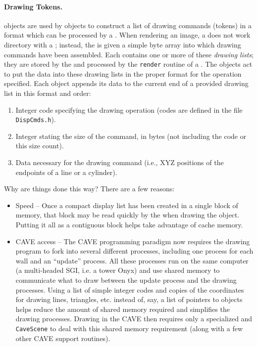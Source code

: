\paragraph{Drawing Tokens.}
 objects are used by  objects to construct a list of drawing commands (tokens) in a format which can be processed by a .  When rendering an image, a  does not work directory with a ; instead, the  is given a simple byte array into which drawing commands have been assembled.  Each  contains one or more of these {\em drawing lists}; they are stored by the  and processed by the {\tt render} routine of a .  The  objects act to put the data into these drawing lists in the proper format for the operation specified.  Each  object appends its data to the current end of a provided drawing list in this format and order:
\begin{enumerate}
  \item Integer code specifying the drawing operation (codes are defined in the file {\tt DispCmds.h}).
  \item Integer stating the size of the command, in bytes (not including the code or this size count).
  \item Data necessary for the drawing command (i.e., XYZ positions of the endpoints of a line or a cylinder).
\end{enumerate}
Why are things done this way?  There are a few reasons:
\begin{itemize}
  \item Speed -- Once a compact display list has been created in a single block of memory, that block may be read quickly by the  when drawing the object.  Putting it all as a contiguous block helps take advantage of cache memory.
  \item CAVE access -- The CAVE programming paradigm now requires the drawing program to fork into several different processes, including one process for each wall and an ``update'' process.  All these processes run on the same computer (a multi-headed SGI, i.e. a tower Onyx) and use shared memory to communicate what to draw between the update process and the drawing processes.  Using a list of simple integer codes and copies of the coordinates for drawing lines, triangles, etc. instead of, say, a list of pointers to  objects helps reduce the amount of shared memory required and simplifies the drawing processes.  Drawing in the CAVE then requires only a specialized  and {\tt CaveScene} to deal with this shared memory requirement (along with a few other CAVE support routines).
\end{itemize} 

